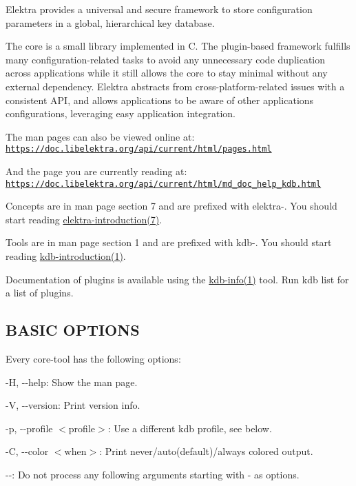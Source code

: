 Elektra provides a universal and secure framework to store configuration parameters in a global, hierarchical key database.

The core is a small library implemented in C. The plugin-\/based framework fulfills many configuration-\/related tasks to avoid any unnecessary code duplication across applications while it still allows the core to stay minimal without any external dependency. Elektra abstracts from cross-\/platform-\/related issues with a consistent A\+PI, and allows applications to be aware of other applications\textquotesingle{} configurations, leveraging easy application integration.

The man pages can also be viewed online at\+: \href{https://doc.libelektra.org/api/current/html/pages.html}{\tt https\+://doc.\+libelektra.\+org/api/current/html/pages.\+html}

And the page you are currently reading at\+: \href{https://doc.libelektra.org/api/current/html/md_doc_help_kdb.html}{\tt https\+://doc.\+libelektra.\+org/api/current/html/md\+\_\+doc\+\_\+help\+\_\+kdb.\+html}

Concepts are in man page section 7 and are prefixed with {\ttfamily elektra-\/}. You should start reading \hyperlink{md_doc_help_elektra-introduction_doc_help_elektra-introduction_md}{elektra-\/introduction(7)}.

Tools are in man page section 1 and are prefixed with {\ttfamily kdb-\/}. You should start reading \hyperlink{md_doc_help_kdb-introduction_doc_help_kdb-introduction_md}{kdb-\/introduction(1)}.

Documentation of plugins is available using the \hyperlink{md_doc_help_kdb-info_doc_help_kdb-info_md}{kdb-\/info(1)} tool. Run {\ttfamily kdb list} for a list of plugins.

\subsection*{B\+A\+S\+IC O\+P\+T\+I\+O\+NS}

Every core-\/tool has the following options\+:


\begin{DoxyItemize}
\item {\ttfamily -\/H}, {\ttfamily -\/-\/help}\+: Show the man page.
\item {\ttfamily -\/V}, {\ttfamily -\/-\/version}\+: Print version info.
\item {\ttfamily -\/p}, {\ttfamily -\/-\/profile $<$profile$>$}\+: Use a different kdb profile, see below.
\item {\ttfamily -\/C}, {\ttfamily -\/-\/color $<$when$>$}\+: Print never/auto(default)/always colored output.
\item {\ttfamily -\/-\/}\+: Do not process any following arguments starting with {\ttfamily -\/} as options.
\end{DoxyItemize}

